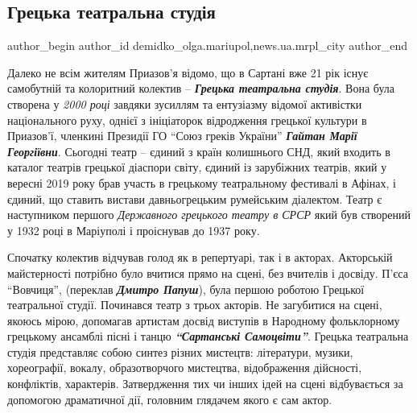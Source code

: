  
 
 
 
 
 
\subsection{Грецька театральна студія}
\label{sec:10_02_2021.stz.news.ua.mrpl_city.1.grecka_teatralna_studia}
 
\ifcmt
 author_begin
   author_id demidko_olga.mariupol,news.ua.mrpl_city
 author_end
\fi


Далеко не всім жителям Приазов'я відомо, що в Сартані вже 21 рік існує
самобутній та колоритний колектив – \emph{\textbf{Грецька театральна студія}}. Вона була
створена у \emph{2000 році} завдяки зусиллям та ентузіазму відомої активістки
національного руху, однієї з ініціаторок відродження грецької культури в
Приазов'ї, членкині Президії ГО \enquote{Союз греків України} \emph{\textbf{Гайтан Марії Георгіївни}}.
Сьогодні театр – єдиний з країн колишнього СНД, який входить в каталог театрів
грецької діаспори світу, єдиний із зарубіжних театрів, який у вересні 2019 року
брав участь в грецькому театральному фестивалі в Афінах, і єдиний, що ставить
вистави давньогрецьким румейським діалектом. Театр є наступником першого
\emph{Державного грецького театру в СРСР} який був створений у 1932 році в Маріуполі і
проіснував до 1937 року.

Спочатку колектив відчував голод як в репертуарі, так і в акторах. Акторській
майстерності потрібно було вчитися прямо на сцені, без вчителів і досвіду.
П'єса \enquote{Вовчиця}, (переклав \emph{\textbf{Дмитро Папуш}}), була першою роботою Грецької
театральної студії. Починався театр з трьох акторів. Не загубитися на сцені,
якоюсь мірою, допомагав артистам досвід виступів в Народному фольклорному
грецькому ансамблі пісні і танцю \emph{\textbf{\enquote{Сартанські Самоцвіти}}}. Грецька театральна
студія представляє собою синтез різних мистецтв: літератури, музики,
хореографії, вокалу, образотворчого мистецтва, відображення дійсності,
конфліктів, характерів. Затвердження тих чи інших ідей на сцені відбувається за
допомогою драматичної дії, головним глядачем якого є сам актор.

